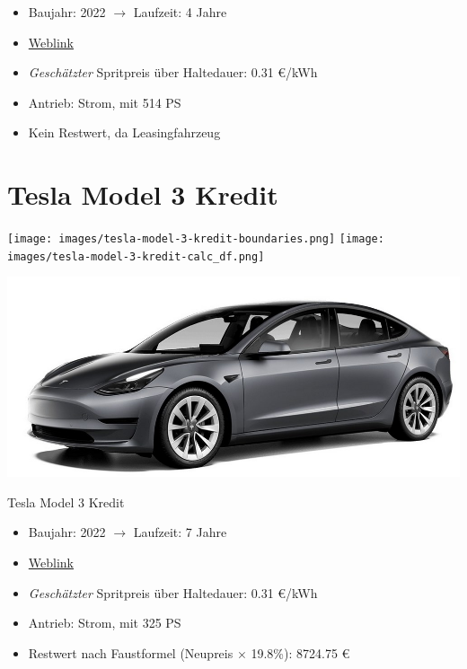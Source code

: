 \documentclass[landscape, DIV=99, 14pt]{scrartcl}
\begin{document}
\begin{itemize}
    \item Baujahr: 2022 $\rightarrow$ Laufzeit: 4 Jahre
    \item \href{https://www.tesla.com/de_de/modely/design\#overview}{Weblink}
    \item \emph{Gesch\"atzter} Spritpreis \"uber Haltedauer: 0.31 \euro{}/kWh
    \item Antrieb: Strom, mit 514 PS
    \item Kein Restwert, da Leasingfahrzeug
\end{itemize}

\pagebreak


\twocolumn

\section*{Tesla Model 3 Kredit}
\begin{center}
\texttt{[image: images/tesla-model-3-kredit-boundaries.png]}
\null
\vspace{0.5cm}
\texttt{[image: images/tesla-model-3-kredit-calc\_df.png]}
\end{center}

\pagebreak
\null
\vspace{2cm}
\begin{center}
\includegraphics[width=0.9\columnwidth]{cars/tesla-model-3.jpg}

Tesla Model 3 Kredit
\end{center}

\begin{itemize}
    \item Baujahr: 2022 $\rightarrow$ Laufzeit: 7 Jahre
    \item \href{https://www.tesla.com/de_de/model3/design\#overview}{Weblink}
    \item \emph{Gesch\"atzter} Spritpreis \"uber Haltedauer: 0.31 \euro{}/kWh
    \item Antrieb: Strom, mit 325 PS
    \item Restwert nach Faustformel (Neupreis $\times$ 19.8\%): 8724.75 \euro{}
\end{itemize}
\end{document}
